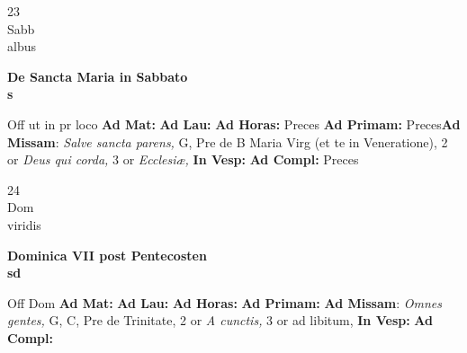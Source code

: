 \documentclass[10pt, openany]{book}
\begin{document}
    \begin{center}
        \begin{minipage}{3.5in}
            \vspace{2em}
            \begin{minipage}{0.5in}
                {\Huge 23} \\
                {\normalsize Sabb} \\
                {\normalsize albus}
            \end{minipage}
            \begin{minipage}{3.0in}
                \textbf{ \large De Sancta Maria in Sabbato \\
                \textnormal{\normalsize s}} \\ 
            \end{minipage}
            \begin{justify}Off ut in pr loco
                \textbf{Ad Mat: }
                \textbf{Ad Lau: }
                \textbf{Ad Horas: }Preces
                \textbf{Ad Primam: }Preces\textbf{Ad Missam}: \textit{Salve sancta parens,} G, Pre de B Maria Virg (et te in Veneratione), 2 or \textit{Deus qui corda,} 3 or \textit{Ecclesiæ,}  
                \textbf{In Vesp: }
                \textbf{Ad Compl: }Preces
            \end{justify}
        \end{minipage}
    \end{center}

    \begin{center}
        \begin{minipage}{3.5in}
            \vspace{2em}
            \begin{minipage}{0.5in}
                {\Huge 24} \\
                {\normalsize Dom} \\
                {\normalsize viridis}
            \end{minipage}
            \begin{minipage}{3.0in}
                \textbf{ \large Dominica VII post Pentecosten \\
                \textnormal{\normalsize sd}} \\ 
            \end{minipage}
            \begin{justify}Off Dom
                \textbf{Ad Mat: }
                \textbf{Ad Lau: }
                \textbf{Ad Horas: }
                \textbf{Ad Primam: }\textbf{Ad Missam}: \textit{Omnes gentes,} G, C, Pre de Trinitate, 2 or \textit{A cunctis,} 3 or ad libitum,  
                \textbf{In Vesp: }
                \textbf{Ad Compl: }
            \end{justify}
        \end{minipage}
    \end{center}
\end{document}
